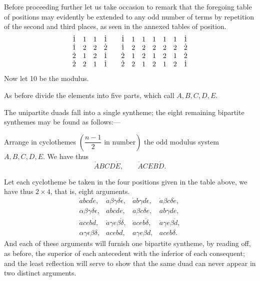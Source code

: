 \documentclass[11pt]{article}
\newcommand{\sourcepage}[1]{\marginpar{\scriptsize p.~#1}}
\newcommand{\dotter}[1]{\dot{#1}}
\begin{document}
{{Before proceeding further let us take occasion to remark that the foregoing table of positions may evidently be extended to any odd number of terms by repetition of the second and third places, as seen in the annexed tables of position.
\[
\begin{array}{llll@{\qquad}lllllll}
\dotter1&1&1&\dotter1&\dotter1&1&1&1&1&1&\dotter1\\
\dotter1&2&2&\dotter2&\dotter1&2&2&2&2&2&\dotter2\\
\dotter2&1&2&\dotter1&\dotter2&1&2&1&2&1&\dotter2\\
\dotter2&2&1&\dotter1&\dotter2&2&1&2&1&2&\dotter1
\end{array}
\]
Now let 10 be the modulus.

As before divide the elements into five parts, which call $A,B,C,D,E$.

The unipartite duads fall into a single syntheme; the eight remaining bipartite synthemes may be found as follows:---

Arrange in cyclothemes $\left(\dfrac{n-1}{2}\text{ in number}\right)$ the odd modulus system $A,B,C,D,E$. We have thus
\[
\dotter A B C D\dotter E,
\qquad
\dotter A C E B\dotter D.
\]

\sourcepage{96}
Let each cyclotheme be taken in the four positions given in the table above, we have thus $2\times4$, that is, eight arguments.
\[
\begin{array}{llll}
\dotter a b c d\dotter e,& \dotter a\beta\gamma\delta\dotter\epsilon,& \dotter a b\gamma d\dotter\epsilon,& \dotter a\beta c\delta\dotter e,\\
\alpha\beta\gamma\delta\epsilon,& abcde,& a\beta c\delta e,& ab\gamma d e,\\
\dotter a c e b\dotter d,& \dotter a\gamma e\beta\dotter\delta,& \dotter a c e b\dotter\delta,& \dotter a\gamma e\beta\dotter d,\\
\alpha\gamma\epsilon\beta\delta,& acebd,& a\gamma e\beta d,& aceb\delta.
\end{array}
\]
And each of these arguments will furnish one bipartite syntheme, by reading off, as before, the superior of each antecedent with the inferior of each consequent; and the least reflection will serve to show that the same duad can never appear in two distinct arguments.

}}
\end{document}

